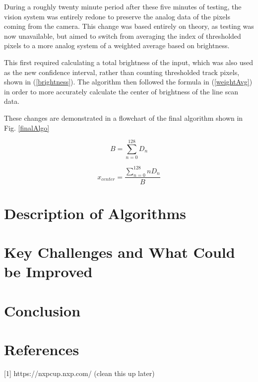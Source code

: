 \documentclass[conference]{IEEEtran}
\begin{document}
    During a roughly twenty minute period after these five minutes of testing, the vision system was entirely redone to preserve the analog
    data of the pixels coming from the camera.
    This change was based entirely on theory, as testing was now unavailable, but aimed to switch from averaging the index of thresholded pixels
    to a more analog system of a weighted average based on brightness.

    This first required calculating a total brightness of the input, which was also used as the new confidence interval, rather than counting
    thresholded track pixels, shown in (\ref{brightness}).
    The algorithm then followed the formula in (\ref{weightAvg}) in order to more accurately calculate the center of brightness of the line scan
    data.

    These changes are demonstrated in a flowchart of the final algorithm shown in Fig. \ref{finalAlgo}

\begin{equation}
    B = {\sum_{n=0}^{128}D_{n}}
    \label{brightness}
\end{equation}

\begin{equation}
    x_{center} = \frac{\sum_{n=0}^{128}nD_{n}}{B}
    \label{weightAvg}
\end{equation}

\section{Description of Algorithms}

\section{Key Challenges and What Could be Improved}

\section{Conclusion}


\section{References}
[1] https://nxpcup.nxp.com/ (clean this up later)

\begin{thebibliography}{00}
    \end{thebibliography}
\end{document}
